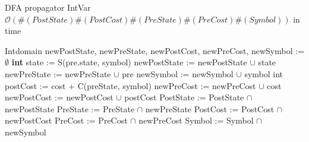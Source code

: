 \begin{algorithm}[H]
\label{fig:algint}
\caption{DFA propagator IntVar\newline
 $\mathcal{O}(\#(PostState)\#(PostCost)\#(PreState)\#(PreCost)\#(Symbol))$ in time}
\begin{algorithmic}[1]
\State Intdomain newPostState, newPreState, newPostCost, newPreCost, newSymbol := $\emptyset$
		\State \textbf{int} state := S(pre.state, symbol)
					\State newPostState := newPostState $\cup$ state
			\State newPreState := newPreState $\cup$ pre
			\State newSymbol := newSymbol $\cup$ symbol 
				\State int postCost := cost + C(preState, symbol)
					\State newPreCost := newPreCost $\cup$ cost
					\State newPostCost := newPostCost $\cup$ postCost
				\EndIf
			\EndFor
		\EndIf
	\EndFor
\EndFor
\State PostState := PostState $\cap$ newPostState
\State PreState := PreState $\cap$ newPreState
\State PostCost := PostCost $\cap$ newPostCost
\State PreCost := PreCost $\cap$ newPreCost
\State Symbol := Symbol $\cap$ newSymbol
\EndProcedure
\end{algorithmic}
\end{algorithm} 

